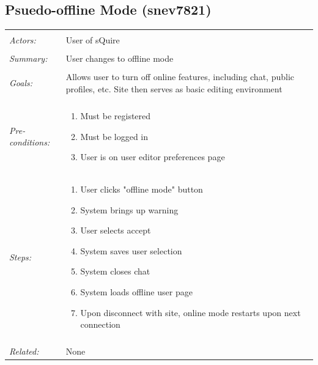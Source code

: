 \documentclass[11pt]{report}
\begin{document}
\subsection{Psuedo-offline Mode (snev7821)}
\begin{tabular}{ p{2cm} p{12cm} }
\hline
\\
	\textit{Actors:} & User of sQuire \\
	\\
	\textit{Summary:} & User changes to offline mode \\
	\\
	\textit{Goals:} & Allows user to turn off online features, including chat, public profiles, etc. Site then serves as basic editing environment\\
	\\
	\textit{Pre-conditions:} & \begin{enumerate}
		\item Must be registered
		\item Must be logged in
		\item User is on user editor preferences page
	\end{enumerate}
	\\
\textit{Steps:} & \begin{enumerate}
		\item User clicks "offline mode" button
		\item System brings up warning
		\item User selects accept
		\item System saves user selection
		\item System closes chat
		\item System loads offline user page
		\item Upon disconnect with site, online mode restarts upon next connection
	\end{enumerate} \\
	\\
	\textit{Related:} & None \\
\hline
\end{tabular}
\newpage
\end{document}
